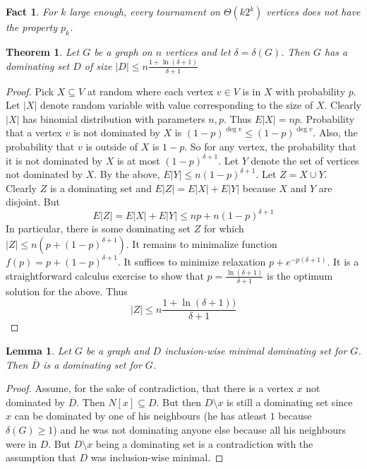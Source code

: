 \documentclass{article}
\theoremstyle{plain}
\newtheorem{thm}{Theorem}
\newtheorem{lem}{Lemma}[thm]
\newtheorem{fact}{Fact}
\theoremstyle{definition}
\begin{document}
\begin{fact}
	For $k$ large enough, every tournament on $\Theta(k2^k)$ vertices does not have the property $p_k$.
\end{fact}
	

\begin{thm}
	Let $G$ be a graph on $n$ vertices and let $\delta=\delta(G)$. Then $G$ has a dominating set $D$ of size $|D|\leq n\frac{1+\ln(\delta + 1)}{\delta + 1}$
\end{thm}
\begin{proof}
	Pick $X\subseteq V$ at random where each vertex $v\in V$ is in $X$ with probability $p$. Let $|X|$ denote random variable with value corresponding to the size of $X$. Clearly $|X|$ has binomial distribution with parameters $n,p$. Thus $E|X|=np$. Probability that a vertex $v$ is not dominated by $X$ is $(1-p)^{\deg v}\leq (1-p)^{\deg v}$. Also, the probability that $v$ is outside of $X$ is $1-p$. So for any vertex, the probability that it is not dominated by $X$ is at most $(1-p)^{\delta+1}$. Let $Y$ denote the set of vertices not dominated by $X$. By the above, $E|Y|\leq n (1-p)^{\delta + 1}$. Let $Z=X\cup Y$. Clearly $Z$ is a dominating set and $E|Z|=E|X|+E|Y|$ because $X$ and $Y$ are disjoint. But
	$$
	E|Z|=E|X| + E|Y|\leq np+n(1-p)^{\delta + 1}
	$$
	In particular, there is some dominating set $Z$ for which $|Z|\leq n(p+(1-p)^{\delta+1})$. It remains to minimalize function $f(p)=p+(1-p)^{\delta+1}$. It suffices to minimize relaxation $p+e^{-p(\delta + 1)}$. It is a straightforward calculus exercise to show that $p=\frac{\ln(\delta + 1)}{\delta + 1}$ is the optimum solution for the above. Thus 
	$$|Z|\leq n\frac{1+\ln(\delta + 1))}{\delta + 1}$$
\end{proof}

\begin{lem}
	Let $G$ be a graph and $D$ inclusion-wise minimal dominating set for $G$. Then $\overline{D}$ is a dominating set for $G$.
\end{lem}
\begin{proof}
	Assume, for the sake of contradiction, that there is a vertex $x$ not dominated by $\overline{D}$. Then $N[x]\subseteq D$. But then $D\setminus x$ is still a dominating set since $x$ can be dominated by one of his neighbours (he has atleast $1$ because $\delta(G)\geq 1$) and he was not dominating anyone else because all his neighbours were in $D$. But $D\setminus x$ being a dominating set is a contradiction with the assumption that $D$ was inclusion-wise minimal.
\end{proof}
\end{document}
